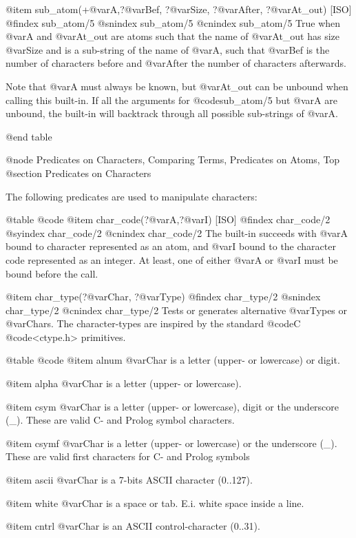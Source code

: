 {{{{@item sub_atom(+@var{A},?@var{Bef}, ?@var{Size}, ?@var{After}, ?@var{At_out}) [ISO]
@findex sub_atom/5
@snindex sub_atom/5
@cnindex sub_atom/5
True when @var{A} and @var{At_out} are atoms such that the name of
@var{At_out} has size @var{Size} and is a sub-string of the name of
@var{A}, such that @var{Bef} is the number of characters before and
@var{After} the number of characters afterwards.

Note that @var{A} must always be known, but @var{At_out} can be unbound when
calling this built-in. If all the arguments for @code{sub_atom/5} but @var{A}
are unbound, the built-in will backtrack through all possible
sub-strings of @var{A}.

@end table

@node Predicates on Characters, Comparing Terms, Predicates on Atoms, Top
@section Predicates on Characters

The following predicates are used to manipulate characters:

@table @code
@item char_code(?@var{A},?@var{I}) [ISO]
@findex char_code/2
@syindex char_code/2
@cnindex char_code/2
The built-in succeeds with @var{A} bound to character represented as an
atom, and @var{I} bound to the character code represented as an
integer. At least, one of either @var{A} or @var{I} must be bound before
the call.

@item char_type(?@var{Char}, ?@var{Type})
@findex char_type/2
@snindex char_type/2
@cnindex char_type/2
    Tests or generates alternative @var{Types} or @var{Chars}. The
    character-types are inspired by the standard @code{C}
    @code{<ctype.h>} primitives.

@table @code
@item    alnum
        @var{Char} is a letter (upper- or lowercase) or digit.

@item    alpha
        @var{Char} is a letter (upper- or lowercase).

@item    csym
        @var{Char} is a letter (upper- or lowercase), digit or the underscore (_). These are valid C- and Prolog symbol characters.

@item    csymf
        @var{Char} is a letter (upper- or lowercase) or the underscore (_). These are valid first characters for C- and Prolog symbols

@item    ascii
        @var{Char} is a 7-bits ASCII character (0..127).

@item    white
        @var{Char} is a space or tab. E.i. white space inside a line.

@item    cntrl
        @var{Char} is an ASCII control-character (0..31).

}}}}
